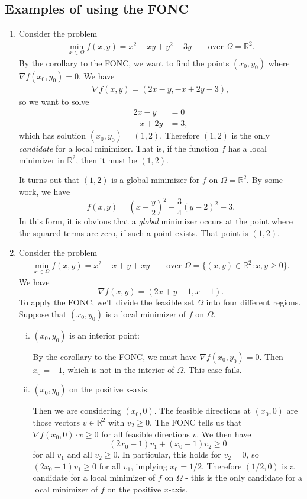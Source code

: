 \documentclass[11pt]{book}
\newcommand{\R}{\mathbb{R}}
\begin{document}
\subsection{Examples of using the FONC}
\begin{enumerate}
\item 
Consider the problem
\begin{align*}
\min_{x \in \Omega} f(x,y) = x^2 - xy + y^2 - 3y \qquad \text{over } \Omega = \R^2.
\end{align*}
By the corollary to the FONC, we want to find the points $(x_0, y_0)$ where $\nabla f(x_0, y_0) = 0$. We have
\begin{align*}
\nabla f(x,y) = (2x-y, -x+2y-3),
\end{align*}
so we want to solve 
\begin{align*}
2x - y &= 0 \\
-x + 2y &= 3,
\end{align*}
which has solution $(x_0, y_0) = (1,2)$. Therefore $(1,2)$ is the only \emph{candidate} for a local minimizer. That is, if the function $f$ has a local minimizer in $\R^2$, then it must be $(1,2)$.

It turns out that $(1,2)$ is a global minimizer for $f$ on $\Omega = \R^2$. By some work, we have
\[
f(x,y) = \left(x - \frac{y}{2}\right)^2 + \frac{3}{4}(y-2)^2 - 3.
\]
In this form, it is obvious that a \emph{global} minimizer occurs at the point where the squared terms are zero, if such a point exists. That point is $(1,2)$.

\item
Consider the problem
\begin{align*}
\min_{x \in \Omega} f(x,y) = x^2 - x + y + xy \qquad \text{over } \Omega = \{(x,y) \in \R^2 : x,y \geq 0\}.
\end{align*}
We have
\[
\nabla f(x,y) = (2x + y - 1, x + 1).
\]
To apply the FONC, we'll divide the feasible set $\Omega$ into four different regions. Suppose that $(x_0, y_0)$ is a local minimizer of $f$ on $\Omega$.
\begin{enumerate}[(i)]
\item $(x_0, y_0)$ is an interior point: 

By the corollary to the FONC, we must have $\nabla f(x_0, y_0) = 0$. Then $x_0 = -1$, which is not in the interior of $\Omega$. This case fails.

\item $(x_0, y_0)$ on the positive x-axis: 

Then we are considering $(x_0, 0)$. The feasible directions at $(x_0, 0)$ are those vectors $v \in \R^2$ with $v_2 \geq 0$. The FONC tells us that $\nabla f(x_0,0) \cdot v \geq 0$ for all feasible directions $v$. We then have
\[
(2x_0 - 1)v_1 + (x_0 + 1)v_2 \geq 0
\]
for all $v_1$ and all $v_2 \geq 0$. In particular, this holds for $v_2 = 0$, so $(2x_0 - 1)v_1 \geq 0$ for all $v_1$, implying $x_0 = 1/2$. Therefore $(1/2, 0)$ is a candidate for a local minimizer of $f$ on $\Omega$ - this is the only candidate for a local minimizer of $f$ on the positive $x$-axis.


\end{enumerate}
\end{enumerate}
\end{document}
